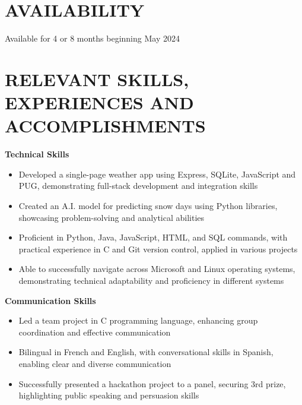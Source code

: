 \documentclass[a4paper,11pt]{article}
\begin{document}
\vspace{2pt}
\section{AVAILABILITY}
	Available for 4 or 8 months beginning May 2024\\

\vspace{2pt}
\section{RELEVANT SKILLS, EXPERIENCES AND ACCOMPLISHMENTS }
	\begin{minipage}{\linewidth}
    \textbf{Technical Skills}
    \begin{itemize}
    \item Developed a single-page weather app using Express, SQLite, JavaScript and PUG, demonstrating full-stack development and integration skills
    \item Created an A.I. model for predicting snow days using Python libraries, showcasing problem-solving and analytical abilities
    \item Proficient in Python, Java, JavaScript, HTML, and SQL commands, with practical experience in C and Git version control, applied in various projects
    \item Able to successfully navigate across Microsoft and Linux operating systems, demonstrating technical adaptability and proficiency in different systems 
\end{itemize}
\end{minipage}
\vspace{5pt}

\begin{minipage}{\linewidth}
    \textbf{Communication Skills}
    \begin{itemize}
    \item Led a team project in C programming language, enhancing group coordination and effective communication
    \item Bilingual in French and English, with conversational skills in Spanish, enabling clear and diverse communication
    \item Successfully presented a hackathon project to a panel, securing 3rd prize, highlighting public speaking and persuasion skills 
\end{itemize}
\end{minipage}
\end{document}
